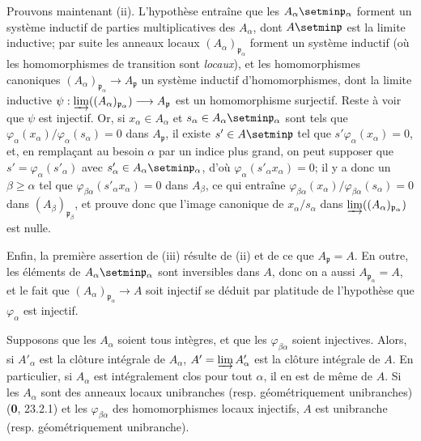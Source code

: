 Prouvons maintenant (ii). L'hypothèse entraîne que les
$A_\alpha\setmin\mathfrak p_\alpha$ forment un système inductif de parties
multiplicatives des $A_\alpha$, dont $A\setmin\mathfrak p$ est la limite inductive;
par suite les anneaux locaux $(A_\alpha)_{\mathfrak p_\alpha}$ forment un
système inductif (où les homomorphismes de transition sont \emph{locaux}), et les
homomorphismes canoniques
$(A_\alpha)_{\mathfrak p_\alpha}\to A_{\mathfrak p}$ un système inductif
d'homomorphismes, dont la limite inductive
$\psi:\varinjlim((A_\alpha)_{\mathfrak p_\alpha})
\longrightarrow A_{\mathfrak p}$
est un homomorphisme surjectif. Reste à voir que $\psi$ est injectif. Or, si
$x_\alpha\in A_\alpha$ et
$s_\alpha\in A_\alpha\setmin\mathfrak p_\alpha$ sont tels que
$\varphi_\alpha(x_\alpha)/\varphi_\alpha(s_\alpha)=0$ dans $A_{\mathfrak p}$,
il existe $s'\in A\setmin\mathfrak p$ tel que
$s'\varphi_\alpha(x_\alpha)=0$, et, en remplaçant au besoin $\alpha$ par un
indice plus grand, on peut supposer que $s'=\varphi_\alpha(s'_\alpha)$ avec
$s'_\alpha\in A_\alpha\setmin\mathfrak p_\alpha$, d'où
$\varphi_\alpha(s'_\alpha x_\alpha)=0$; il y a donc un $\beta\geq\alpha$ tel
que $\varphi_{\beta\alpha}(s'_\alpha x_\alpha)=0$ dans $A_\beta$, ce qui
entraîne
$\varphi_{\beta\alpha}(x_\alpha)/\varphi_{\beta\alpha}(s_\alpha)=0$ dans
$(A_\beta)_{\mathfrak p_\beta}$, et prouve donc que l'image canonique de
$x_\alpha/s_\alpha$ dans
$\varinjlim((A_\alpha)_{\mathfrak p_\alpha})$ est nulle.

Enfin, la première assertion de (iii) résulte de (ii) et de ce que
$A_{\mathfrak p}=A$. En outre, les éléments de
$A_\alpha\setmin\mathfrak p_\alpha$ sont inversibles dans $A$, donc on a aussi
$A_{\mathfrak p_\alpha}=A$, et le fait que
$(A_\alpha)_{\mathfrak p_\alpha}\to A$ soit injectif se déduit par platitude
de l'hypothèse que $\varphi_\alpha$ est injectif.

\begin{corollary}[5.13.4]
\label{IV.2.s5.13.4-fr}
Supposons que les $A_\alpha$ soient tous intègres, et que les
$\varphi_{\beta\alpha}$ soient injectives. Alors, si $A'_\alpha$ est la clôture
intégrale de $A_\alpha$, $A'=\varinjlim A'_\alpha$ est la clôture intégrale de
$A$. En particulier, si $A_\alpha$ est intégralement clos pour tout $\alpha$,
il en est de même de $A$. Si les $A_\alpha$ sont des anneaux locaux unibranches
\textup{(resp.} géométriquement unibranches) \textup{(\textbf{0}, 23.2.1)} et les
$\varphi_{\beta\alpha}$ des homomorphismes locaux injectifs, $A$ est unibranche
\textup{(resp.} géométriquement unibranche).
\end{corollary}

